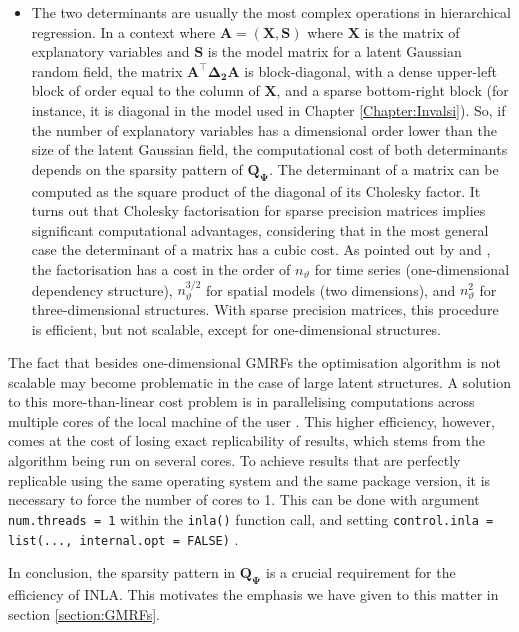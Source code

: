 \documentclass[openany, 11pt, oneside]{book}
\begin{document}
\begin{itemize}
\item The two determinants are usually the most complex operations in hierarchical regression. In a context where $\boldsymbol{A} = (\boldsymbol{X}, \boldsymbol{S})$ where $\boldsymbol{X}$ is the matrix of explanatory variables and $\boldsymbol{S}$ is the model matrix for a latent Gaussian random field, the matrix $\boldsymbol{A}^\top \boldsymbol{\Delta_2A}$ is block-diagonal, with a dense upper-left block of order equal to the column of $\boldsymbol{X}$, and a sparse bottom-right block (for instance, it is diagonal in the model used in Chapter \ref{Chapter:Invalsi}). So, if the number of explanatory variables has a dimensional order lower than the size of the latent Gaussian field, the computational cost of both determinants depends on the sparsity pattern of $\boldsymbol{Q_\Psi}$. The determinant of a matrix can be computed as the square product of the diagonal of its Cholesky factor. It turns out that Cholesky factorisation for sparse precision matrices implies significant computational advantages, considering that in the most general case the determinant of a matrix has a cubic cost. As pointed out by \cite{GMRFs} and \cite{INLA}, the factorisation has a cost in the order of $n_\vartheta$ for time series (one-dimensional dependency structure), $n_\vartheta^{3/2}$ for spatial models (two dimensions), and $n_\vartheta^2$ for three-dimensional structures. With sparse precision matrices, this procedure is efficient, but not scalable, except for one-dimensional structures.
\end{itemize}

The fact that besides one-dimensional GMRFs the optimisation algorithm is not scalable may become problematic in the case of large latent structures. A solution to this more-than-linear cost problem is in parallelising computations across multiple cores of the local machine of the user \parencite{Parallel, VBINLA2023}. This higher efficiency, however, comes at the cost of losing exact replicability of results, which stems from the algorithm being run on several cores. To achieve results that are perfectly replicable using the same operating system and the same package version, it is necessary to force the number of cores to 1. This can be done with argument \texttt{num.threads = 1} within the \texttt{inla()} function call, and setting \texttt{control.inla = list(..., internal.opt = FALSE)} \parencite{Wang}.

In conclusion, the sparsity pattern in $\boldsymbol{Q_\Psi}$ is a crucial requirement for the efficiency of INLA. This motivates the emphasis we have given to this matter in section \ref{section:GMRFs}. 
\end{document}
